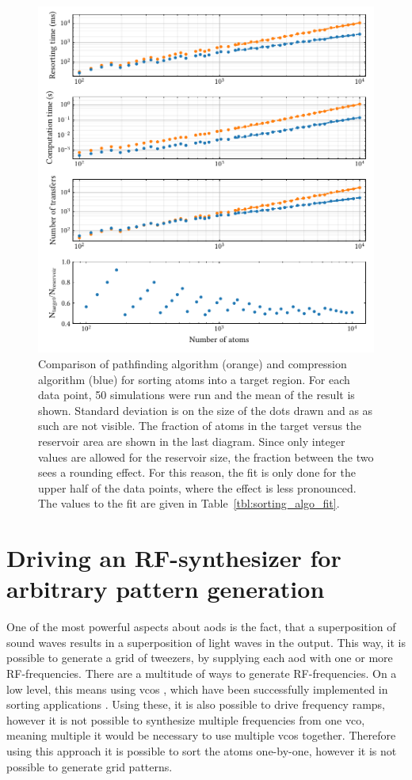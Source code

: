 \begin{figure}[h]%
\label{fig:sorting_algos}
\centering
	\includegraphics{figures/sorting_algos_155.pdf}
	\caption{Comparison of pathfinding algorithm (orange) and compression algorithm (blue) for sorting atoms into a target region. For each data point, 50 simulations were run and the mean of the result is shown. Standard deviation is on the size of the dots drawn and as as such are not visible. The fraction of atoms in the target versus the reservoir area are shown in the last diagram. Since only integer values are allowed for the reservoir size, the fraction between the two sees a rounding effect. For this reason, the fit is only done for the upper half of the data points, where the effect is less pronounced. The values to the fit are given in Table~\ref{tbl:sorting_algo_fit}.}
\end{figure}

\section{Driving an RF-synthesizer for arbitrary pattern generation}

One of the most powerful aspects about \acp{aod} is the fact, that a superposition of sound waves results in a superposition of light waves in the output. This way, it is possible to generate a grid of tweezers, by supplying each \ac{aod} with one or more RF-frequencies. There are a multitude of ways to generate RF-frequencies. On a low level, this means using \acp{vco} , which have been successfully implemented in sorting applications . Using these, it is also possible to drive frequency ramps, however it is not possible to synthesize multiple frequencies from one \ac{vco}, meaning multiple it would be necessary to use multiple \acp{vco} together. Therefore using this approach it is possible to sort the atoms one-by-one, however it is not possible to generate grid patterns.


